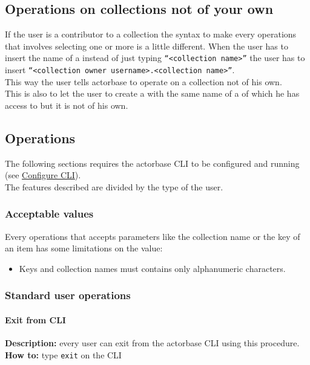\documentclass{scalatekids-article}
\begin{document}
\subsection{Operations on collections not of your own}
\label{sec:contributoroperations}
If the user is a contributor to a collection the syntax to make every operations that involves selecting one or more 
 is a little different. When the user has to insert the name of a  instead of 
just typing \texttt{``<collection name>''} the user has to insert \texttt{``<collection owner username>.<collection name>''}.\\This way the user tells actorbase to operate on a collection not of his own.\\This is also to let the user to 
create a  with the same name of a  of which he has access to but it is not of 
his own. 

\subsection{Operations}

The following sections requires the actorbase CLI to be configured and
running (see \hyperref[sec:configurationcli]{Configure CLI}).\\
The features described are divided by the type of the user.\\

\subsubsection{Acceptable values}
Every operations that accepts parameters like the collection name or the key of 
an item has some limitations on the value:
\begin{itemize}
  \item Keys and collection names must contains only alphanumeric characters.
\end{itemize}


\subsubsection{Standard user operations}
\label{sec:everyuser}

\paragraph{Exit from CLI}
\textbf{Description:} every user can exit from the actorbase CLI
using this procedure.\\
\textbf{How to:} type \texttt{exit} on the CLI
\end{document}
